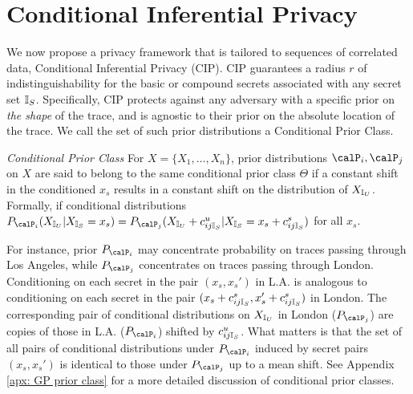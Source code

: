 \section{Conditional Inferential Privacy}
We now propose a privacy framework that is tailored to sequences of correlated data, Conditional Inferential Privacy (CIP). CIP guarantees a radius $r$ of indistinguishability for the basic or compound secrets associated with any secret set ${\mathbb{I}_S}$. Specifically, CIP protects against any adversary with a specific prior on \emph{the shape} of the trace, and is agnostic to their prior on the absolute location of the trace. We call the set of such prior distributions a Conditional Prior Class.

\begin{definition} \emph{Conditional Prior Class}
\label{def: conditional prior class}
	For $X = \{X_1, \dots, X_n\}$, prior distributions $\calP_i, \calP_j$ on $X$ are said to belong to the same conditional prior class $\Theta$ if a constant shift in the conditioned $x_s$ results in a constant shift on the distribution of ${X_{\mathbb{I}_U}}$. Formally, if conditional distributions $P_{\calP_i}(\Xu | \Xs = x_s) = P_{\calP_j}(\Xu + c_{ij\Is}^u  | \Xs = x_s + c_{ij\Is}^s )$ for all $x_s$.
\end{definition}

For instance, prior $P_{\calP_i}$ may concentrate probability on traces passing through Los Angeles, while $P_{\calP_j}$ concentrates on traces passing through London. Conditioning on each secret in the pair $(x_s, x_s')$ in L.A. is analogous to conditioning on each secret in the pair $(x_s + c_{ij{\mathbb{I}_S}}^s, x_s' + c_{ij{\mathbb{I}_S}}^s)$ in London. The corresponding pair of conditional distributions on ${X_{\mathbb{I}_U}}$ in London ($P_{\calP_j}$) are copies of those in L.A. ($P_{\calP_i}$) shifted by $c_{ij{\mathbb{I}_S}}^u$. What matters is that the set of all pairs of conditional distributions under $P_{\calP_i}$ induced by secret pairs $(x_s, x_s')$ is identical to those under $P_{\calP_j}$ up to a mean shift. See Appendix \ref{apx: GP prior class} for a more detailed discussion of conditional prior classes.  
 
